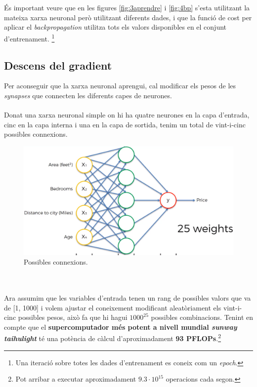 \documentclass[12pt]{article}
\begin{document}
\\\\És important veure que en les figures \ref{fig:3aprendre} i \ref{fig:4bp} s'esta utilitzant la mateixa xarxa neuronal però utilitzant diferents dades, i que la funció de cost per aplicar el \textit{backpropagation} utilitza tots els valors disponibles en el conjunt d'entrenament. \footnote{Una iteració sobre totes les dades d'entrenament es coneix com un \textit{epoch}.}


\clearpage
\subsection{Descens del gradient\label{dg}}
Per aconseguir que la xarxa neuronal aprengui, cal modificar els pesos de les \textit{synapses} que connecten les diferents capes de neurones.
\\\\Donat una xarxa neuronal simple on hi ha quatre neurones en la capa d'entrada, cinc en la capa interna i una en la capa de sortida, tenim un total de vint-i-cinc possibles connexions. 
\begin{figure}[h!]
	\centering
	\includegraphics[scale=0.3]{imatges/dg/1dg.png}
	\caption{Possibles connexions.}
\end{figure}
\\\\Ara assumim que les variables d'entrada tenen un rang de possibles valors que va de [1, 1000] i volem ajustar el coneixement modificant aleatòriament els vint-i-cinc possibles pesos, això fa que hi hagui \textbf{$1000^{25}$} possibles combinacions. Tenint en compte que el \textbf{supercomputador més potent a nivell mundial \textit{sunway taihulight}} té una potència de càlcul d'aproximadament \textbf{93 PFLOPs}\cite{SC}.\footnote{Pot arribar a executar aproximadament $9.3 \cdot 10^{15}$ operacions cada segon.}
\end{document}
